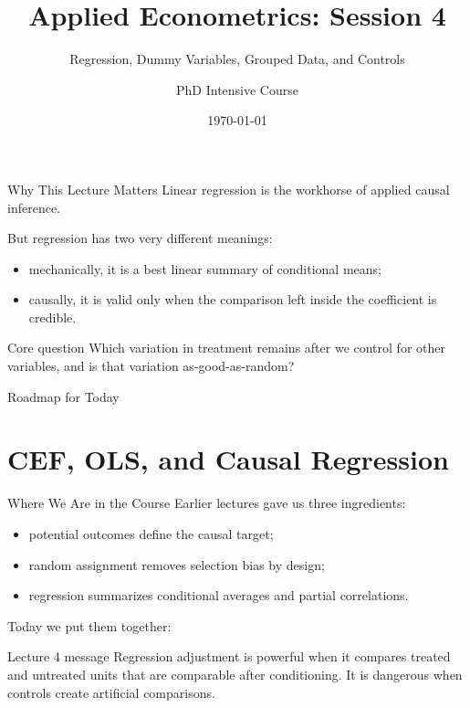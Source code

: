 \documentclass[11pt,aspectratio=169]{beamer}
\title{Applied Econometrics: Session 4}
\subtitle{Regression, Dummy Variables, Grouped Data, and Controls}
\author{PhD Intensive Course}
\institute{Lecture 4}
\date{\today}
\begin{document}
\begin{frame}
  \titlepage
\end{frame}

\begin{frame}{Why This Lecture Matters}
  Linear regression is the workhorse of applied causal inference.
  \vspace{0.4em}

  But regression has two very different meanings:
  \begin{itemize}
    \item mechanically, it is a best linear summary of conditional means;
    \item causally, it is valid only when the comparison left inside the coefficient is credible.
  \end{itemize}
  \begin{block}{Core question}
    Which variation in treatment remains after we control for other variables, and is that variation as-good-as-random?
  \end{block}
\end{frame}

\begin{frame}{Roadmap for Today}
  \tableofcontents
\end{frame}

\section{CEF, OLS, and Causal Regression}

\begin{frame}{Where We Are in the Course}
  Earlier lectures gave us three ingredients:
  \begin{itemize}
    \item potential outcomes define the causal target;
    \item random assignment removes selection bias by design;
    \item regression summarizes conditional averages and partial correlations.
  \end{itemize}
  \vspace{0.3em}
  Today we put them together:
  \begin{block}{Lecture 4 message}
    Regression adjustment is powerful when it compares treated and untreated units that are comparable after conditioning. It is dangerous when controls create artificial comparisons.
  \end{block}
\end{frame}
\end{document}
